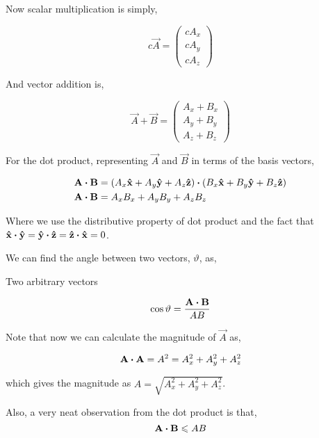 Now scalar multiplication is simply, 

\[
    c\vec{A} = 
    \begin{pmatrix}
        cA_x \\
        cA_y \\
        cA_z
    \end{pmatrix}
\]

And vector addition is,

\[
    \vec{A} + \vec{B} = 
    \begin{pmatrix}
        A_x + B_x\\
        A_y + B_y\\
        A_z + B_z 
    \end{pmatrix}
\]

For the dot product, representing \(\vec{A}\) and \(\vec{B}\) in terms of the basis vectors,

\begin{align*}
    \vec{A} \dtp \vec{B} &= (A_x \unitv{x} + A_y \unitv{y} + A_z \unitv{z}) \dtp (B_x \unitv{x} + B_y \unitv{y} + B_z \unitv{z}) \\
    \vec{A} \dtp \vec{B} &= A_xB_x + A_yB_y + A_zB_z
\end{align*}

Where we use the distributive property of dot product and the fact 
that \(\unitv{x} \dtp \unitv{y} = \unitv{y} \dtp \unitv{z} = \unitv{z} \dtp \unitv{x} = 0\).

We can find the angle between two vectors, \(\vartheta\), as,

\begin{marginfigure}
    \centering
    \caption{Two arbitrary vectors}
\end{marginfigure}

\begin{equation*}
    \cos\vartheta = \frac{\vec{A} \dtp \vec{B}}{AB}
\end{equation*}

Note that now we can calculate the magnitude of \(\vec{A}\) as, 

\begin{equation*}
    \vec{A} \dtp \vec{A} = A^2 = A_x^2 + A_y^2 + A_z^2
\end{equation*}

which gives the magnitude as \(A = \sqrt{A_x^2 + A_y^2 + A_z^2}\).

Also, a very neat observation from the dot product is that,
\begin{equation*}
    \vec{A} \dtp \vec{B} \le AB
\end{equation*}

